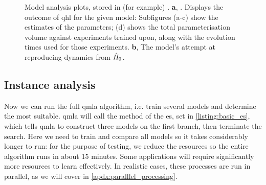 \begin{figure}[H]
    \begin{center}
    \qquad
    \end{center}
    \caption[Model analysis plots]{
        Model analysis plots, stored in (for example) . 
        \textbf{a}, . 
        Displays the outcome of \gls{qhl} for the given model:
        Subfigures (a-c) show the estimates of the parameters; 
        (d) shows the total parameterisation \gls{volume} against \glspl{experiment} trained upon, 
        along with the evolution times used for those \glspl{experiment}. 
        \textbf{b},  The model's attempt at reproducing dynamics from $\hat{H}_0$. 
    }
    \label{fig:model_analysis}
\end{figure}

\subsection{Instance analysis}
Now we can run the full \gls{qmla} algorithm, i.e. train several models 
    and determine the most suitable. 
\gls{qmla} will call the  method of the  \gls{es},
    set in \cref{listing:basic_es}, which tells \gls{qmla} to construct three models
    on the first branch, then terminate the search.
Here we need to train and compare all models so it takes considerably longer to run:
    for the purpose of testing, we reduce the resources so the entire algorithm runs in about 15 minutes.
Some applications will require significantly more resources to learn effectively.
In realistic cases, these processes are run in parallel, as we will cover in \cref{apdx:paralllel_processing}.
\par 


